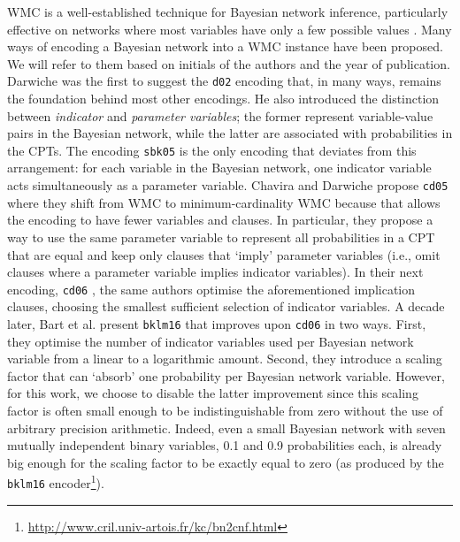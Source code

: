 \documentclass[runningheads]{llncs}
\begin{document}
WMC is a well-established technique for Bayesian network inference, particularly
effective on networks where most variables have only a few possible values
\cite{DBLP:conf/kr/Darwiche02}. Many ways of encoding a Bayesian network into a
WMC instance have been proposed. We will refer to them based on initials of the
authors and the year of publication. Darwiche was the first to suggest the
\texttt{d02} \cite{DBLP:conf/kr/Darwiche02} encoding that, in many ways, remains
the foundation behind most other encodings. He also introduced the distinction
between \emph{indicator} and \emph{parameter variables}; the former represent
variable-value pairs in the Bayesian network, while the latter are associated
with probabilities in the CPTs. The encoding \texttt{sbk05}
\cite{DBLP:conf/aaai/SangBK05} is the only encoding that deviates from this
arrangement: for each variable in the Bayesian network, one indicator variable
acts simultaneously as a parameter variable. Chavira and Darwiche propose
\texttt{cd05} \cite{DBLP:conf/ijcai/ChaviraD05} where they shift from WMC to
minimum-cardinality WMC because that allows the encoding to have fewer variables
and clauses. In particular, they propose a way to use the same parameter
variable to represent all probabilities in a CPT that are equal and keep only
clauses that `imply' parameter variables (i.e., omit clauses where a parameter
variable implies indicator variables). In their next encoding, \texttt{cd06}
\cite{DBLP:conf/sat/ChaviraD06}, the same authors optimise the aforementioned
implication clauses, choosing the smallest sufficient selection of indicator
variables. A decade later, Bart et al. present \texttt{bklm16}
\cite{DBLP:conf/ecai/BartKLM16} that improves upon \texttt{cd06} in two ways.
First, they optimise the number of indicator variables used per Bayesian network
variable from a linear to a logarithmic amount. Second, they introduce a scaling
factor that can `absorb' one probability per Bayesian network variable. However,
for this work, we choose to disable the latter improvement since this scaling
factor is often small enough to be indistinguishable from zero without the use
of arbitrary precision arithmetic. Indeed, even a small Bayesian network with
seven mutually independent binary variables, 0.1 and 0.9 probabilities each, is
already big enough for the scaling factor to be exactly equal to zero (as
produced by the \texttt{bklm16}
encoder\footnote{\url{http://www.cril.univ-artois.fr/kc/bn2cnf.html}}).

\end{document}

